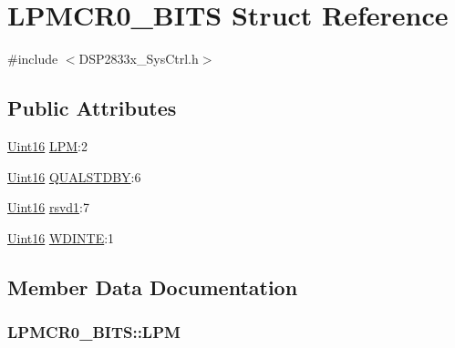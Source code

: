 \hypertarget{struct_l_p_m_c_r0___b_i_t_s}{}\section{L\+P\+M\+C\+R0\+\_\+\+B\+I\+T\+S Struct Reference}
\label{struct_l_p_m_c_r0___b_i_t_s}


{\ttfamily \#include $<$D\+S\+P2833x\+\_\+\+Sys\+Ctrl.\+h$>$}

\subsection*{Public Attributes}
\begin{DoxyCompactItemize}
\item 
\hyperlink{_d_s_p2833x___device_8h_a59a9f6be4562c327cbfb4f7e8e18f08b}{Uint16} \hyperlink{struct_l_p_m_c_r0___b_i_t_s_a0dd11dbf77e6190bb2e889160a314bab}{L\+P\+M}\+:2
\item 
\hyperlink{_d_s_p2833x___device_8h_a59a9f6be4562c327cbfb4f7e8e18f08b}{Uint16} \hyperlink{struct_l_p_m_c_r0___b_i_t_s_a4b57c1a9470af75c774798d18db0424b}{Q\+U\+A\+L\+S\+T\+D\+B\+Y}\+:6
\item 
\hyperlink{_d_s_p2833x___device_8h_a59a9f6be4562c327cbfb4f7e8e18f08b}{Uint16} \hyperlink{struct_l_p_m_c_r0___b_i_t_s_aa0d1e76767df9dcf9f1f7edb4d67e825}{rsvd1}\+:7
\item 
\hyperlink{_d_s_p2833x___device_8h_a59a9f6be4562c327cbfb4f7e8e18f08b}{Uint16} \hyperlink{struct_l_p_m_c_r0___b_i_t_s_ae02df05b44f6f2b89b927a500b80bf23}{W\+D\+I\+N\+T\+E}\+:1
\end{DoxyCompactItemize}


\subsection{Member Data Documentation}
\hypertarget{struct_l_p_m_c_r0___b_i_t_s_a0dd11dbf77e6190bb2e889160a314bab}{}
\subsubsection[{L\+P\+M}]{ L\+P\+M\+C\+R0\+\_\+\+B\+I\+T\+S\+::\+L\+P\+M}\label{struct_l_p_m_c_r0___b_i_t_s_a0dd11dbf77e6190bb2e889160a314bab}
\hypertarget{struct_l_p_m_c_r0___b_i_t_s_a4b57c1a9470af75c774798d18db0424b}{}
